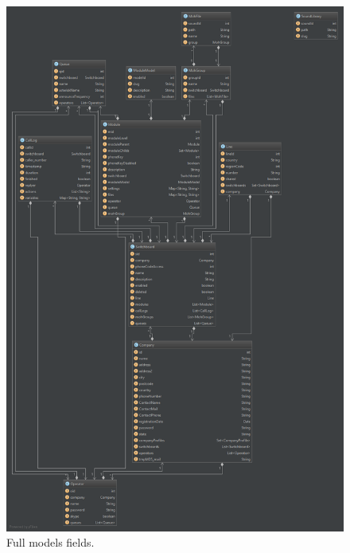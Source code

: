 \begin{figure}[!ht]
  \caption{Full models fields.}
  \centering
    \includegraphics[width=1\textwidth]{img/models.png}
\end{figure}


